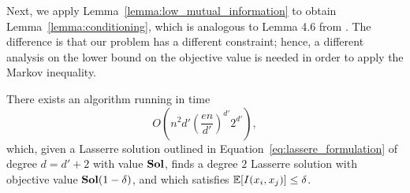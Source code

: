Next, we apply Lemma~\ref{lemma:low_mutual_information} to obtain Lemma~\ref{lemma:conditioning}, which is analogous to Lemma 4.6 from \citet{DBLP:conf/soda/RaghavendraT12}. The difference is that our problem \maxcutkc has a different constraint; hence, a different analysis on the lower bound on the objective value is needed in order to apply the Markov inequality.

\begin{lemma}\label{lemma:conditioning}
There exists an algorithm running in time 
\begin{equation*}
	O\left(n^{2}d' \left(\frac{en}{d'} \right)^{d'}2^{d'}\right),
\end{equation*}
which, given a Lasserre solution outlined in Equation~\eqref{eq:lassere_formulation} of degree $d= d'+2$ with value $\mathbf{Sol}$, finds 
a degree $2$  Lasserre solution with objective value 
$\mathbf{Sol} (1-\delta)$, and which satisfies $\operatorname*{\mathbb{E}}[I(x_i, x_j)] \leq \delta$.
\end{lemma}

